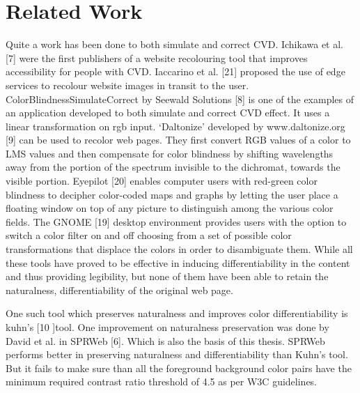 

\section{Related Work}
\label{Related Work}

Quite a work has been done to both simulate and correct CVD. Ichikawa et al. [7] were the first publishers of a website recolouring tool that improves accessibility for people with CVD. Iaccarino et al. [21] proposed the use of edge services to recolour website images in transit to the user. ColorBlindnessSimulateCorrect by Seewald Solutions [8] is one of the examples of an application developed to both simulate and correct CVD effect. It uses a linear transformation on rgb input. ‘Daltonize’ developed by www.daltonize.org [9] can be used to recolor web pages. They first convert RGB values of a color to LMS values and then compensate for color blindness by shifting wavelengths away from the portion of the spectrum invisible to the dichromat, towards the visible portion.  Eyepilot [20] enables computer users with red-green color blindness to decipher color-coded maps and graphs by letting the user place a floating window on top of any picture to distinguish among the various color fields. The GNOME [19] desktop environment provides users with the option to switch a color filter on and off choosing from a set of possible color transformations that displace the colors in order to disambiguate them. While all these tools have proved to be effective in inducing differentiability in the content and thus providing legibility, but none of them have been able to retain the naturalness, differentiability of the original web page.

One such tool which preserves naturalness and improves color differentiability is kuhn’s [10 ]tool. One improvement on naturalness preservation was done by David et al. in SPRWeb [6]. Which is also the basis of this thesis. SPRWeb performs better in preserving naturalness and differentiability than Kuhn’s tool. But it fails to make sure than all the foreground background color pairs have the minimum required contrast ratio threshold of 4.5 as per W3C guidelines.

